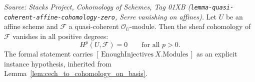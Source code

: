 \begin{lemma}
  \label{lem:affine_serre_vanishing}
  \textit{Source: Stacks Project, Cohomology of Schemes, Tag 01XB
  (\texttt{lemma-quasi-coherent-affine-cohomology-zero}, Serre vanishing on
  affines).}
  Let \(U\) be an affine scheme and \(\mathcal{F}\) a quasi-coherent
  \(\mathcal{O}_U\)-module. Then the sheaf cohomology of \(\mathcal{F}\) vanishes in
  all positive degrees:
  \[
    H^p(U, \mathcal{F}) = 0 \qquad \text{for all } p > 0.
  \]
  The formal statement carries \([\,\mathrm{EnoughInjectives}\ X.\mathrm{Modules}\,]\) as an
  explicit instance hypothesis, inherited from Lemma~\ref{lem:cech_to_cohomology_on_basis}.
\end{lemma}

